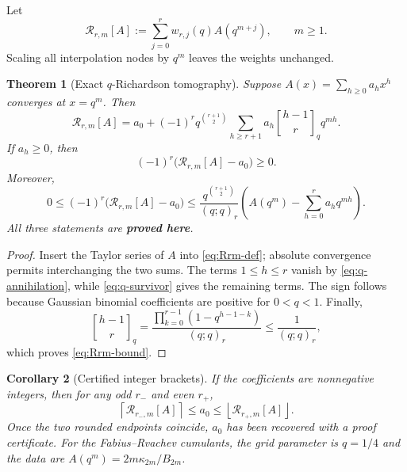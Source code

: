 \documentclass[11pt,oneside]{article}
\numberwithin{equation}{section}
\newtheorem{theorem}{Theorem}[section]
\newtheorem{corollary}[theorem]{Corollary}
\theoremstyle{definition}
\theoremstyle{remark}
\newcommand{\qbinom}[3]{\genfrac{[}{]}{0pt}{}{#1}{#2}_{#3}}
\newcommand{\statusproved}{\textcolor{deepgreen}{\textbf{proved here}}}
\begin{document}
Let
\begin{equation}
 \mathcal R_{r,m}[A]
 :=\sum_{j=0}^{r}w_{r,j}(q)A(q^{m+j}),
 \qquad m\ge1.
 \label{eq:Rrm-def}
\end{equation}
Scaling all interpolation nodes by $q^m$ leaves the weights unchanged.

\begin{theorem}[Exact $q$-Richardson tomography]
\label{thm:q-richardson}
Suppose $A(x)=\sum_{h\ge0}a_hx^h$ converges at $x=q^m$.  Then
\begin{equation}
 \boxed{
 \mathcal R_{r,m}[A]
 =a_0+(-1)^r q^{\binom{r+1}{2}}
   \sum_{h\ge r+1}a_h\qbinom{h-1}{r}{q}q^{mh}.}
 \label{eq:Rrm-exact}
\end{equation}
If $a_h\ge0$, then
\begin{equation}
 (-1)^r\bigl(\mathcal R_{r,m}[A]-a_0\bigr)\ge0.
 \label{eq:Rrm-sign}
\end{equation}
Moreover,
\begin{equation}
 0\le(-1)^r\bigl(\mathcal R_{r,m}[A]-a_0\bigr)
 \le
 \frac{q^{\binom{r+1}{2}}}{(q;q)_r}
 \left(A(q^m)-\sum_{h=0}^{r}a_hq^{mh}\right).
 \label{eq:Rrm-bound}
\end{equation}
All three statements are \statusproved.
\end{theorem}

\begin{proof}
Insert the Taylor series of $A$ into \eqref{eq:Rrm-def}; absolute convergence permits
interchanging the two sums.  The terms $1\le h\le r$ vanish by
\eqref{eq:q-annihilation}, while \eqref{eq:q-survivor} gives the remaining terms.
The sign follows because Gaussian binomial coefficients are positive for $0<q<1$.
Finally,
\[
 \qbinom{h-1}{r}{q}
 =\frac{\prod_{k=0}^{r-1}(1-q^{h-1-k})}{(q;q)_r}
 \le\frac1{(q;q)_r},
\]
which proves \eqref{eq:Rrm-bound}.
\end{proof}

\begin{corollary}[Certified integer brackets]
\label{cor:integer-brackets}
If the coefficients are nonnegative integers, then for any odd $r_-$ and even $r_+$,
\begin{equation}
 \left\lceil\mathcal R_{r_-,m}[A]\right\rceil
 \le a_0\le
 \left\lfloor\mathcal R_{r_+,m}[A]\right\rfloor.
 \label{eq:integer-brackets}
\end{equation}
Once the two rounded endpoints coincide, $a_0$ has been recovered with a proof certificate.
For the Fabius--Rvachev cumulants, the grid parameter is $q=1/4$ and the data are
$A(q^m)=2m\kappa_{2m}/B_{2m}$.
\end{corollary}
\end{document}
